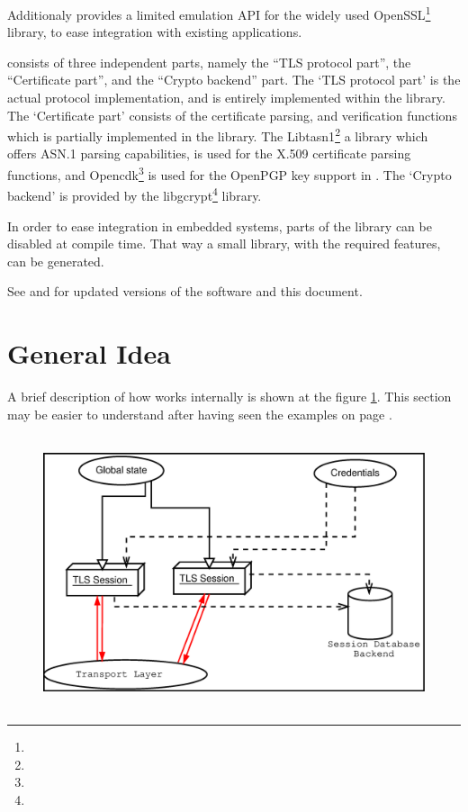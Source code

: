 Additionaly \gnutls{} provides a limited emulation API for the widely used
OpenSSL\footnote{} 
library, to ease integration with existing applications.

\par 
\gnutls{} consists of three
independent parts, namely the ``TLS protocol part'', the ``Certificate part'', and 
the ``Crypto backend'' part.
The `TLS protocol part' is the actual protocol implementation, and is entirely
implemented within the \gnutls{} library.
The `Certificate part' consists of the certificate parsing, and verification
functions which is partially implemented in the \gnutls{} library. The
Libtasn1\footnote{}
a library which offers ASN.1 parsing capabilities, is used for the
X.509 certificate parsing functions, and
Opencdk\footnote{}
is used for the OpenPGP key support in \gnutls{}.
The `Crypto backend' is provided by the 
libgcrypt\footnote{}
library.
\par
In order to ease integration in embedded systems, parts of the \gnutls{} library 
can be disabled at compile time. That way a small library, with the required features,
can be generated.

\par
See 
and  
for updated versions of the \gnutls{} software and this document.


\section{General Idea}
A brief description of how \gnutls{} works internally is shown at
the figure \ref{fig:internals}. This section may be easier to understand
after having seen the examples on page \pageref{examples}.

\begin{figure}[htp]
\includegraphics[height=8cm,width=12cm]{internals}
\label{fig:internals}
\end{figure}

